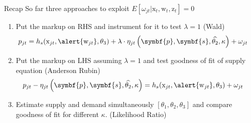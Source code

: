 \documentclass[aspectratio=169,10pt]{beamer}
\begin{document}
\begin{frame}{Recap}
\small
So far three approaches to exploit $ E[\omega_{jt} | \textrm{x}_{t}, \textrm{w}_{t}, \textrm{z}_{t}]=0$
\begin{enumerate}
\item Put the markup on RHS and instrument for it to test $\lambda=1$ (Wald)
\begin{align*}
 p_{jt} &= h_s(\textrm{x}_{jt}, \alert{\textrm{w}_{jt}},\theta_3) + \lambda \cdot \eta_{jt}\left(\symbf{p},\symbf{s},\widehat{\theta_2},\kappa \right)+  \omega_{jt}
\end{align*}
\item Put the markup on LHS assuming $\lambda=1$ and test goodness of fit of supply equation (Anderson Rubin)
\begin{align*}
 p_{jt} -\eta_{jt}\left(\symbf{p},\symbf{s},\widehat{\theta_2},\kappa \right)&= h_s(\textrm{x}_{jt}, \alert{\textrm{w}_{jt}},\theta_3) +  \omega_{jt}
\end{align*}
\item Estimate supply and demand simultaneously $[\theta_1,\theta_2,\theta_3]$ and compare goodness of fit for different $\kappa$. (Likelihood Ratio)
\end{enumerate}

\end{frame}

\end{document}
